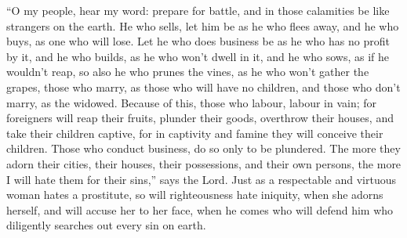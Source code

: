  ``O my people, hear my word: prepare for battle, and in
those calamities be like strangers on the earth.  He who
sells, let him be as he who flees away, and he who buys, as one who will
lose.  Let he who does business be as he who has no profit
by it, and he who builds, as he who won't dwell in it,  and
he who sows, as if he wouldn't reap, so also he who prunes the vines, as
he who won't gather the grapes,  those who marry, as those
who will have no children, and those who don't marry, as the widowed.
 Because of this, those who labour, labour in vain;
 for foreigners will reap their fruits, plunder their
goods, overthrow their houses, and take their children captive, for in
captivity and famine they will conceive their children. 
Those who conduct business, do so only to be plundered. The more they
adorn their cities, their houses, their possessions, and their own
persons,  the more I will hate them for their sins,'' says
the Lord.  Just as a respectable and virtuous woman hates a
prostitute,  so will righteousness hate iniquity, when she
adorns herself, and will accuse her to her face, when he comes who will
defend him who diligently searches out every sin on earth.

